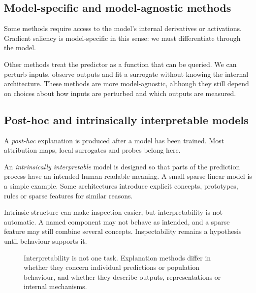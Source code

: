 \subsection{Model-specific and model-agnostic methods}

Some methods require access to the model's internal derivatives or activations. Gradient saliency is model-specific in this sense: we must differentiate through the model.

Other methods treat the predictor as a function that can be queried. We can perturb inputs, observe outputs and fit a surrogate without knowing the internal architecture. These methods are more model-agnostic, although they still depend on choices about how inputs are perturbed and which outputs are measured.

\subsection{Post-hoc and intrinsically interpretable models}

A \emph{post-hoc} explanation is produced after a model has been trained. Most attribution maps, local surrogates and probes belong here.

An \emph{intrinsically interpretable} model is designed so that parts of the prediction process have an intended human-readable meaning. A small sparse linear model is a simple example. Some architectures introduce explicit concepts, prototypes, rules or sparse features for similar reasons.

Intrinsic structure can make inspection easier, but interpretability is not automatic. A named component may not behave as intended, and a sparse feature may still combine several concepts. Inspectability remains a hypothesis until behaviour supports it.

\begin{figure}[ht]
  \caption{Interpretability is not one task. Explanation methods differ in whether they concern individual predictions or population behaviour, and whether they describe outputs, representations or internal mechanisms.}
  \label{fig:week6-explanation-map}
\end{figure}

